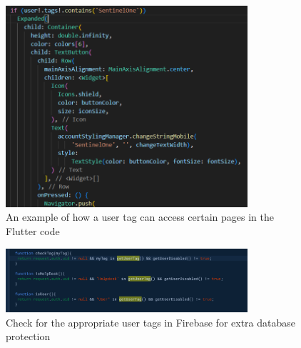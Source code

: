 \begin{figure}[htbp]
      \centering
      \includegraphics[width=0.8\textwidth]{Figures/Qaas App/User tags.png}
      \caption{An example of how a user tag can access certain pages in the Flutter code}
\end{figure}

\begin{figure}[htbp]
      \centering
      \includegraphics[width=0.8\textwidth]{Figures/Qaas App/User Tag Checker.png}
      \caption{Check for the appropriate user tags in Firebase for extra database protection}
\end{figure}


